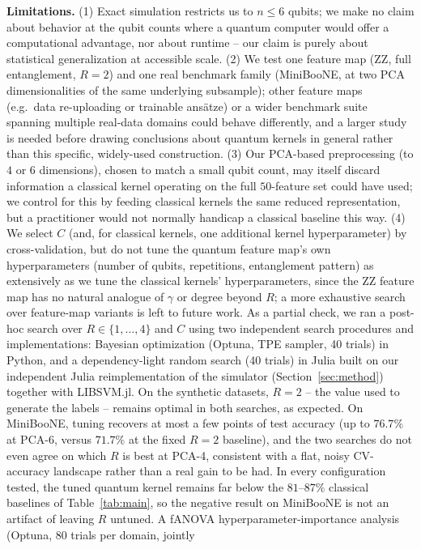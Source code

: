 \documentclass{article}
\begin{document}
\textbf{Limitations.} (1) Exact simulation restricts us to $n \le 6$ qubits;
we make no claim about behavior at the qubit counts where a quantum
computer would offer a computational advantage, nor about runtime -- our
claim is purely about statistical generalization at accessible scale. (2)
We test one feature map (ZZ, full entanglement, $R{=}2$) and one real
benchmark family (MiniBooNE, at two PCA dimensionalities of the same
underlying subsample); other feature maps (e.g.\ data re-uploading or
trainable ans\"atze) or a wider benchmark suite spanning multiple real-data
domains could behave differently, and a larger study is needed before
drawing conclusions about quantum kernels in general rather than this
specific, widely-used construction. (3) Our PCA-based preprocessing (to $4$
or $6$ dimensions), chosen to match a small qubit count, may itself discard
information a classical kernel operating on the full $50$-feature set could
have used; we control for this by feeding classical kernels the same
reduced representation, but a practitioner would not normally handicap a
classical baseline this way. (4) We select $C$ (and, for classical
kernels, one additional kernel hyperparameter) by cross-validation, but do
not tune the quantum feature map's own hyperparameters (number of qubits,
repetitions, entanglement pattern) as extensively as we tune the classical
kernels' hyperparameters, since the ZZ feature map has no natural analogue
of $\gamma$ or degree beyond $R$; a more exhaustive search over feature-map
variants is left to future work. As a partial check, we ran a post-hoc
search over $R \in \{1,\dots,4\}$ and $C$ using two independent search
procedures and implementations: Bayesian optimization (Optuna, TPE
sampler, 40 trials) in Python, and a dependency-light random search (40
trials) in Julia built on our independent Julia reimplementation of the
simulator (Section~\ref{sec:method}) together with LIBSVM.jl. On the
synthetic datasets, $R{=}2$ -- the value used to generate the labels --
remains optimal in both searches, as expected. On MiniBooNE, tuning
recovers at most a few points of test accuracy (up to $76.7\%$ at PCA-6,
versus $71.7\%$ at the fixed $R{=}2$ baseline), and the two searches do not
even agree on which $R$ is best at PCA-4, consistent with a flat, noisy
CV-accuracy landscape rather than a real gain to be had. In every
configuration tested, the tuned quantum kernel remains far below the
$81$--$87\%$ classical baselines of Table~\ref{tab:main}, so the negative
result on MiniBooNE is not an artifact of leaving $R$ untuned. A fANOVA
hyperparameter-importance analysis (Optuna, 80 trials per domain, jointly
\end{document}
